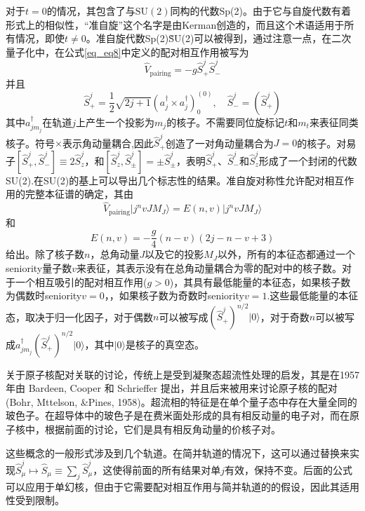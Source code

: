 对于$t=0$的情况，其包含了与$\textrm{SU}(2)$同构的代数Sp(2)。由于它与自旋代数有着形式上的相似性，“准自旋”这个名字是由Kerman创造的，而且这个术语适用于所有情况，即使$t\ne0$。准自旋代数Sp(2)\~SU(2)可以被得到，通过注意一点，在二次量子化中，在公式\ref{eq_eq8}中定义的配对相互作用被写为
\begin{equation}\label{eq_Vpair}
\hat{V}_\textrm{pairing}=-g\hat{S}^j_+\hat{S}^j_-
\end{equation}
并且
\begin{equation}
\hat{S}^j_+=\frac{1}{2}\sqrt{2j+1}(a_j^\dag\times a_j^\dag)^{(0)}_0,\quad\hat{S}^j_-=\left(\hat{S}^j_+\right)
\end{equation}
其中$a_{jm_j}^\dagger$在轨道$j$上产生一个投影为$m_j$的核子。不需要同位旋标记$t$和$m_t$来表征同类核子。符号$\times$表示角动量耦合,因此$\hat{S}^j_+$创造了一对角动量耦合为$J=0$的核子。对易子$[\hat{S}^j_+,\hat{S}^j_-]\equiv2\hat{S}^j_z$，和$[\hat{S}^j_z,\hat{S}^j_\pm]=\pm\hat{S}^j_\pm$，表明$\hat{S}^j_+$、$\hat{S}^j_-$和$\hat{S}^j_z$形成了一个封闭的代数SU(2).在SU(2)的基上可以导出几个标志性的结果。准自旋对称性允许配对相互作用的完整本征谱的确定，其由
\begin{equation}
\hat{V}_\textrm{pairing}|j^nvJM_J\rangle=E(n,v)|j^nvJM_J\rangle
\end{equation}
和
\begin{equation}\label{eq_13}
E(n,v)=-\frac{g}{4}(n-v)(2j-n-v+3)
\end{equation}
给出。除了核子数$n$，总角动量$J$以及它的投影$M_J$以外，所有的本征态都通过一个seniority量子数$v$来表征，其表示没有在总角动量耦合为零的配对中的核子数。对于一个相互吸引的配对相互作用($g>0$)，其具有最低能量的本征态，如果核子数为偶数时seniority$v=0$，，如果核子数为奇数时seniority$v=1$.这些最低能量的本征态，取决于归一化因子，对于偶数$n$可以被写成$(\hat{S}^j_+)^{n/2}|0\rangle$，对于奇数$n$可以被写成$a_{jm_j}^\dag(\hat{S}^j_+)^{n/2}|0\rangle$，其中$|0\rangle$是核子的真空态。

关于原子核配对关联的讨论，传统上是受到凝聚态超流性处理的启发，其是在1957年由 Bardeen, Cooper 和 Schrieffer 提出，并且后来被用来讨论原子核的配对(Bohr, Mttelson, \&Pines, 1958)。超流相的特征是在单个量子态中存在大量全同的玻色子。在超导体中的玻色子是在费米面处形成的具有相反动量的电子对，而在原子核中，根据前面的讨论，它们是具有相反角动量的价核子对。

这些概念的一般形式涉及到几个轨道。在简并轨道的情况下，这可以通过替换来实现$\hat{S}_\mu^j\mapsto\hat{S}_\mu\equiv\sum_j\hat{S}^j_\mu$，这使得前面的所有结果对单$j$有效，保持不变。后面的公式可以应用于单幻核，但由于它需要配对相互作用与简并轨道的的假设，因此其适用性受到限制。

